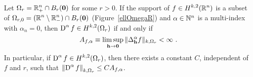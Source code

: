 \begin{cor} \label{ell_reg_cor3}
Let $\displaystyle \Omega_r = \mathbb{R}^n_+ \cap B_r(\mathbf{0})$ for some $r>0$.
If the support of $\displaystyle f\in H^{k,2}(\mathbb{R}^n)$ is a subset of
$\displaystyle \Omega_{r,0} = (\mathbb{R}^n \setminus \mathbb{R}^n_-) \cap
B_r(\mathbf{0})$ (Figure~\ref{ellOmegaR}) and
$\alpha \in \mathbb{N}^n$ is a multi-index with $\alpha_n=0$, then
$\displaystyle \operatorname{D}^\alpha f \in H^{k,2}(\Omega_r)$ if and only if
\[
A_{f,\alpha} \equiv \limsup_{\mathbf{h}\rightarrow \mathbf{0}}
\|\Delta^\alpha_{\mathbf{h}} f\|_{k,\Omega_r} < \infty \ .
\]
In particular, if $\displaystyle \operatorname{D}^\alpha f \in H^{k,2}(\Omega_r)$,
then there exists a constant $C$, independent of $f$ and $r$, such that 
$\displaystyle \left\| \operatorname{D}^\alpha f \right\|_{k,\Omega_r} \leq
C A_{f,\alpha}$.
\end{cor}

